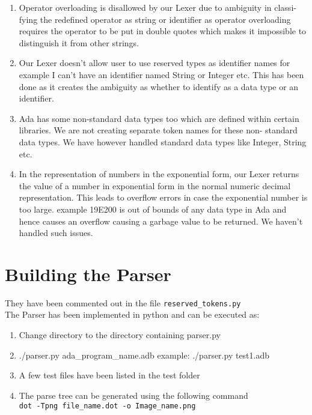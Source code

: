 \documentclass[12pt]{article}%
\begin{document}
\begin{enumerate}
\item Operator overloading is disallowed by our Lexer due to ambiguity in classi-
fying the redefined operator as string or identifier as operator overloading
requires the operator to be put in double quotes which makes it impossible
to distinguish it from other strings.

\item Our Lexer doesn’t allow user to use reserved types as identifier names for
example I can’t have an identifier named String or Integer etc. This has
been done as it creates the ambiguity as whether to identify as a data type
or an identifier.

\item Ada has some non-standard data types too which are defined within certain libraries. We are not creating separate token names for these non-
standard data types. We have however handled standard data types like
Integer, String etc.

\item In the representation of numbers in the exponential form, our Lexer returns
the value of a number in exponential form in the normal numeric decimal
representation. This leads to overflow errors in case the exponential number is too large. example 19E200 is out of bounds of any data type in Ada
and hence causes an overflow causing a garbage value to be returned. We
haven’t handled such issues.
\end{enumerate}

\section{Building the Parser}
They have been commented out in the file {\tt reserved\_tokens.py} \\

The Parser has been implemented in python and can be executed as:
\begin{enumerate}
\item  Change directory to the directory containing parser.py
\item   ./parser.py ada\_program\_name.adb
example: ./parser.py test1.adb
\item A few test files have been listed in the test folder
\item The parse tree can be generated using the following command \\
{\tt dot -Tpng file\_name.dot -o Image\_name.png}

\end{enumerate}
\end{document}
